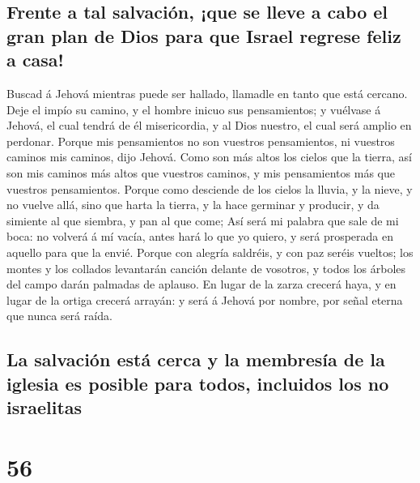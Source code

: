 \hypertarget{frente-a-tal-salvaciuxf3n-que-se-lleve-a-cabo-el-gran-plan-de-dios-para-que-israel-regrese-feliz-a-casa}{%
\subsection{Frente a tal salvación, ¡que se lleve a cabo el gran plan de
Dios para que Israel regrese feliz a
casa!}\label{frente-a-tal-salvaciuxf3n-que-se-lleve-a-cabo-el-gran-plan-de-dios-para-que-israel-regrese-feliz-a-casa}}

 Buscad á Jehová mientras puede ser hallado, llamadle en
tanto que está cercano.  Deje el impío su camino, y el
hombre inicuo sus pensamientos; y vuélvase á Jehová, el cual tendrá de
él misericordia, y al Dios nuestro, el cual será amplio en perdonar.
 Porque mis pensamientos no son vuestros pensamientos, ni
vuestros caminos mis caminos, dijo Jehová.  Como son más
altos los cielos que la tierra, así son mis caminos más altos que
vuestros caminos, y mis pensamientos más que vuestros pensamientos.
 Porque como desciende de los cielos la lluvia, y la
nieve, y no vuelve allá, sino que harta la tierra, y la hace germinar y
producir, y da simiente al que siembra, y pan al que come;
 Así será mi palabra que sale de mi boca: no volverá á mí
vacía, antes hará lo que yo quiero, y será prosperada en aquello para
que la envié.  Porque con alegría saldréis, y con paz
seréis vueltos; los montes y los collados levantarán canción delante de
vosotros, y todos los árboles del campo darán palmadas de aplauso.
 En lugar de la zarza crecerá haya, y en lugar de la
ortiga crecerá arrayán: y será á Jehová por nombre, por señal eterna que
nunca será raída.

\hypertarget{la-salvaciuxf3n-estuxe1-cerca-y-la-membresuxeda-de-la-iglesia-es-posible-para-todos-incluidos-los-no-israelitas}{%
\subsection{La salvación está cerca y la membresía de la iglesia es
posible para todos, incluidos los no
israelitas}\label{la-salvaciuxf3n-estuxe1-cerca-y-la-membresuxeda-de-la-iglesia-es-posible-para-todos-incluidos-los-no-israelitas}}

\hypertarget{section-23-56}{%
\section{56}\label{section-23-56}}

